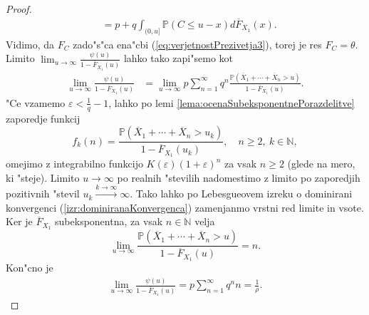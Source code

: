 \documentclass[12pt, a4paper, reqno]{amsart}
\theoremstyle{definition}
\theoremstyle{plain}
\newcommand{\N}{\mathbb{N}}
\newcommand{\Prob}{\mathbb{P}}
\newcommand{\1}{\mathds{1}}
\begin{document}
\begin{proof}
\begin{align*}
                    &= p + q\int_{(0, u]}\Prob\left(C \leq u - x\right)d\overline{F}_{X_1}(x).
            \end{align*}
            Vidimo, da $F_C$ zado"s"ca ena"cbi (\ref{eq:verjetnostPrezivetja3}), torej je res $F_C = \theta$. Limito 
            $\lim_{u\to\infty}\frac{\psi(u)}{1 - \overline{F}_{X_1}(u)}$ lahko tako zapi"semo kot
            \begin{align*}
                \lim_{u\to\infty}\frac{\psi(u)}{1 - \overline{F}_{X_1}(u)}   &= \lim_{u\to\infty}p\sum_{n=1}^{\infty}q^n\frac{\Prob\left(\overline{X}_1 + \cdots +\overline{X}_n > u\right)}{1 - \overline{F}_{X_1}(u)}.
            \end{align*}
            "Ce vzamemo $\varepsilon < \frac{1}{q} - 1$, lahko po lemi \ref{lema:ocenaSubeksponentnePorazdelitve} zaporedje funkcij 
            \begin{equation*}
                f_k(n) = \frac{\Prob\left(\overline{X}_1 + \cdots +\overline{X}_n > u_k\right)}{1 - \overline{F}_{X_1}(u_k)}, \quad n\geq 2,\ k\in\N, 
            \end{equation*}
            omejimo z integrabilno funkcijo $K(\varepsilon)(1 + \varepsilon)^n$ za vsak $n\geq 2$ (glede na mero, ki "steje). Limito $u\to\infty$ po 
            realnih "stevilih nadomestimo z limito po zaporedjih pozitivnih "stevil $u_k\xrightarrow{k\to\infty}\infty$.
            Tako lahko po Lebesgueovem izreku o dominirani konvergenci (\ref{izr:dominiranaKonvergenca})
            zamenjanmo vrstni red limite in vsote.
            Ker je $\overline{F}_{X_1}$ subeksponentna, za vsak $n\in\N$ velja
            \begin{equation*}
                \lim_{u\to\infty}\frac{\Prob\left(\overline{X}_1 + \cdots +\overline{X}_n > u\right)}{1 - \overline{F}_{X_1}(u)} = n.
            \end{equation*}
            Kon"cno je
            \begin{align*}
                \lim_{u\to\infty}\frac{\psi(u)}{1 - \overline{F}_{X_1}(u)} = p\sum_{n=1}^\infty q^nn = \frac{1}{\rho}.
            \end{align*}
        \end{proof}
\end{document}
